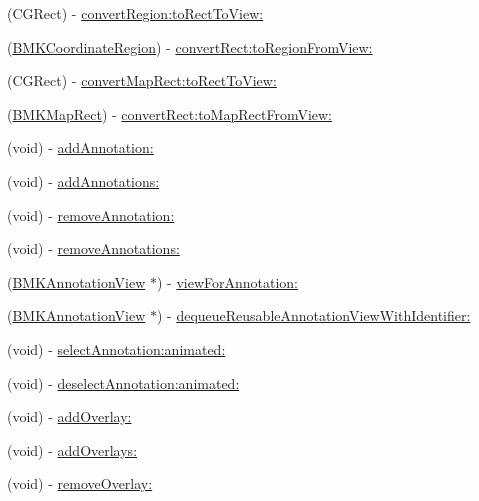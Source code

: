 \begin{DoxyCompactItemize}
\item 
(C\-G\-Rect) -\/ \hyperlink{interface_b_m_k_map_view_a952023c2e24a13c993977d276745f329}{convert\-Region\-:to\-Rect\-To\-View\-:}
\item 
(\hyperlink{struct_b_m_k_coordinate_region}{B\-M\-K\-Coordinate\-Region}) -\/ \hyperlink{interface_b_m_k_map_view_ae99130c0eceabae6c9e202699ba375d1}{convert\-Rect\-:to\-Region\-From\-View\-:}
\item 
(C\-G\-Rect) -\/ \hyperlink{interface_b_m_k_map_view_a4a802244887690c7238bd5c8e18918ae}{convert\-Map\-Rect\-:to\-Rect\-To\-View\-:}
\item 
(\hyperlink{struct_b_m_k_map_rect}{B\-M\-K\-Map\-Rect}) -\/ \hyperlink{interface_b_m_k_map_view_afa77dab84c13620c4ce0dee46df87b46}{convert\-Rect\-:to\-Map\-Rect\-From\-View\-:}
\item 
(void) -\/ \hyperlink{interface_b_m_k_map_view_a1bf0349f0eb4580ca23eac1032345925}{add\-Annotation\-:}
\item 
(void) -\/ \hyperlink{interface_b_m_k_map_view_ad863c0ccb09937907188a408103f8234}{add\-Annotations\-:}
\item 
(void) -\/ \hyperlink{interface_b_m_k_map_view_a5a6efcf38e824c225c8dc3132edb4c02}{remove\-Annotation\-:}
\item 
(void) -\/ \hyperlink{interface_b_m_k_map_view_aa3cccccb36e36704debcdeb0093559f2}{remove\-Annotations\-:}
\item 
(\hyperlink{interface_b_m_k_annotation_view}{B\-M\-K\-Annotation\-View} $\ast$) -\/ \hyperlink{interface_b_m_k_map_view_ac93853efa99f78f20cc2b260bc734511}{view\-For\-Annotation\-:}
\item 
(\hyperlink{interface_b_m_k_annotation_view}{B\-M\-K\-Annotation\-View} $\ast$) -\/ \hyperlink{interface_b_m_k_map_view_a295564a4e2ed533a7ba2fc9f0fe3c008}{dequeue\-Reusable\-Annotation\-View\-With\-Identifier\-:}
\item 
(void) -\/ \hyperlink{interface_b_m_k_map_view_a9b26d1286a51cf260bea06d8ed220316}{select\-Annotation\-:animated\-:}
\item 
(void) -\/ \hyperlink{interface_b_m_k_map_view_a8d2f82aae2c0a536c057239442573fb2}{deselect\-Annotation\-:animated\-:}
\item 
(void) -\/ \hyperlink{interface_b_m_k_map_view_af85ad6091568df29d9e7c3dea82a1a2b}{add\-Overlay\-:}
\item 
(void) -\/ \hyperlink{interface_b_m_k_map_view_ab7d29d948515cc6d947d6aa63f904168}{add\-Overlays\-:}
\item 
(void) -\/ \hyperlink{interface_b_m_k_map_view_a3be1f2a019df3ff971f6a36f142e55be}{remove\-Overlay\-:}

\end{DoxyCompactItemize}
